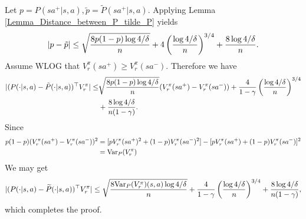 Let $p=P(sa^+|s,a),\tilde p=\tilde P(sa^+|s,a)$. Applying Lemma \ref{Lemma_Distance_between_P_tilde_P} yields 
$$|p-\tilde p|\leq \sqrt{\frac{8 p(1-p) \log 4/\delta}{n}}+4\left({\frac{ \log 4/\delta}{n}}\right)^{3/4}+\frac{8\log 4/\delta}{n}.
$$
Assume WLOG that $V_r^\pi(sa^+)\geq V_r^\pi(sa^-) $.
Therefore we have
$$
\begin{aligned}
|(P(\cdot|s,a)-\tilde{P}(\cdot|s,a))^\top V_r^\pi|\leq &\sqrt{\frac{8 p(1- p) \log 4/\delta}{n}}(V_r^\pi(sa^+)-V_r^\pi(sa^-))+\frac{4}{1-\gamma}\left({\frac{ \log 4/\delta}{n}}\right)^{3/4}\\
&+\frac{8\log 4/\delta}{n(1-\gamma)}.
\end{aligned}
$$
Since
$$
\begin{aligned}
p(1- p)(V_r^\pi(sa^+)- V_r^\pi(sa^-))^2&=[ p V_r^\pi(sa^+)^2+(1- p) V_r^\pi(sa^-)^2]-[ p V_r^\pi(sa^+)+(1- p) V_r^\pi(sa^-)]^2\\
&=\mathrm{Var}_P(V_r^\pi)
\end{aligned}
$$
We may get
$$
|(P(\cdot|s,a)-\widetilde{P}(\cdot|s,a))^\top  V_r^\pi|\leq \sqrt{\frac{8\mathrm{Var}_P(V_r^\pi)(s,a)\log 4/\delta}{n}}+\frac{4}{1-\gamma}\left({\frac{\log 4/\delta}{n}}\right)^{3/4}+\frac{8\log 4/\delta}{n(1-\gamma)},
$$
which completes the proof.
\endproof

